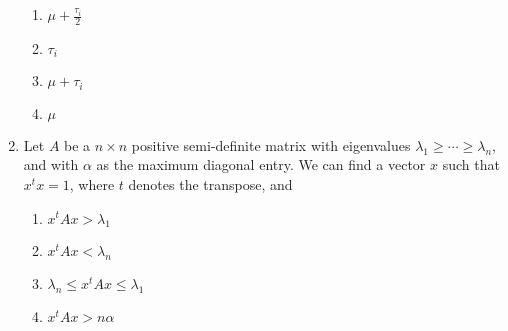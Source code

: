 \documentclass[journal]{IEEEtran}
\begin{document}
\begin{enumerate}
\begin{enumerate}
    \item $\mu + \frac{\tau_i}{2}$
    \item $\tau_i$
    \item $\mu + \tau_i$
    \item $\mu$
\end{enumerate}
\item Let $A$ be a $n \times n$ positive semi-definite matrix with eigenvalues $\lambda_1 \geq \cdots \geq \lambda_n$, and with $\alpha$ as the maximum diagonal entry. We can find a vector $x$ such that $x^t x = 1$, where $t$ denotes the transpose, and
\begin{enumerate}
    \item $x^t A x > \lambda_1$
    \item $x^t A x < \lambda_n$
    \item $\lambda_n \leq x^t A x \leq \lambda_1$
    \item $x^t A x > n \alpha$
\end{enumerate}
\end{enumerate}
\end{document}
